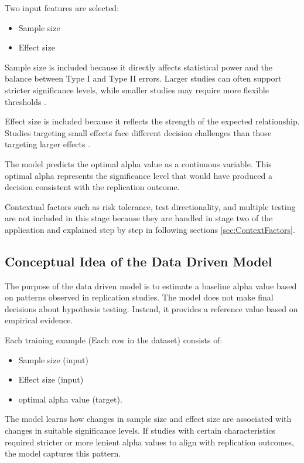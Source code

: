 {Two input features are selected:

\begin{itemize}
	\item Sample size
	\item Effect size
\end{itemize}

Sample size is included because it directly affects statistical power and the balance between Type I and Type II errors. Larger studies can often support stricter significance levels, while smaller studies may require more flexible thresholds \cite{maier2022}.

Effect size is included because it reflects the strength of the expected relationship. Studies targeting small effects face different decision challenges than those targeting larger effects \cite{mudge2012}.

The model predicts the optimal alpha value as a continuous variable. This optimal alpha represents the significance level that would have produced a decision consistent with the replication outcome.

Contextual factors such as risk tolerance, test directionality, and multiple testing are not included in this stage because they are handled in stage two of the application and explained step by step in following sections \ref{sec:ContextFactors}.

\subsection{Conceptual Idea of the Data Driven Model}

The purpose of the data driven model is to estimate a baseline alpha value based on patterns observed in replication studies. The model does not make final decisions about hypothesis testing. Instead, it provides a reference value based on empirical evidence.

Each training example (Each row in the dataset) consists of:

\begin{itemize}
	\item Sample size (input)
	\item Effect size (input)
	\item optimal alpha value (target).
\end{itemize}

The model learns how changes in sample size and effect size are associated with changes in suitable significance levels. If studies with certain characteristics required stricter or more lenient alpha values to align with replication outcomes, the model captures this pattern.

}
